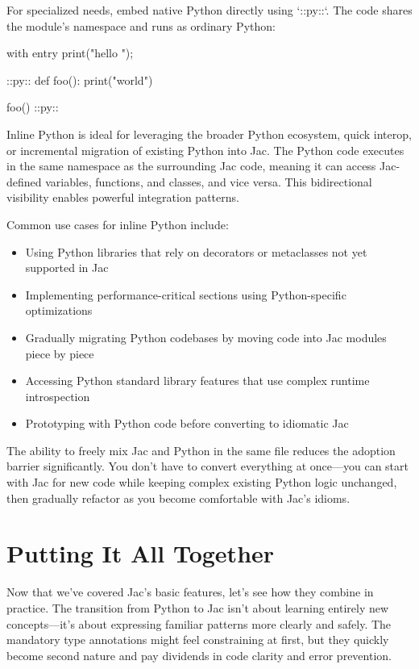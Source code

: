 For specialized needs, embed native Python directly using `::py::`. The code shares the module's namespace and runs as ordinary Python:

\begin{jacblock}
with entry {
    print("hello ");
}

::py::
def foo():
    print("world")

foo()
::py::
\end{jacblock}

Inline Python is ideal for leveraging the broader Python ecosystem, quick interop, or incremental migration of existing Python into Jac. The Python code executes in the same namespace as the surrounding Jac code, meaning it can access Jac-defined variables, functions, and classes, and vice versa. This bidirectional visibility enables powerful integration patterns.

Common use cases for inline Python include:
\begin{itemize}
    \item Using Python libraries that rely on decorators or metaclasses not yet supported in Jac
    \item Implementing performance-critical sections using Python-specific optimizations
    \item Gradually migrating Python codebases by moving code into Jac modules piece by piece
    \item Accessing Python standard library features that use complex runtime introspection
    \item Prototyping with Python code before converting to idiomatic Jac
\end{itemize}

The ability to freely mix Jac and Python in the same file reduces the adoption barrier significantly. You don't have to convert everything at once—you can start with Jac for new code while keeping complex existing Python logic unchanged, then gradually refactor as you become comfortable with Jac's idioms.

\section{Putting It All Together}

Now that we've covered Jac's basic features, let's see how they combine in practice. The transition from Python to Jac isn't about learning entirely new concepts—it's about expressing familiar patterns more clearly and safely. The mandatory type annotations might feel constraining at first, but they quickly become second nature and pay dividends in code clarity and error prevention.

